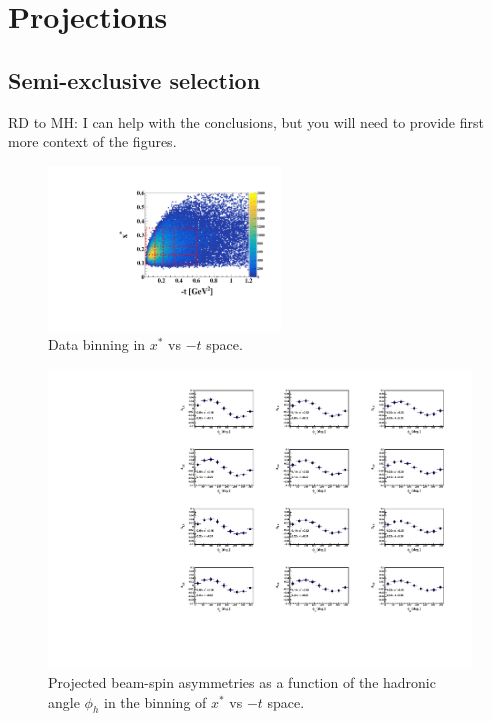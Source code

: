 \section{Projections}
\subsection{Semi-exclusive selection}
RD to MH: I can help with the conclusions, but you will need to provide first more 
context of the figures. 

\begin{figure}[htb]
  \centering
    \includegraphics[width=0.55\textwidth,clip]{figs/pdf/t_x*.pdf}
  \caption{Data binning in $x^{*}$ vs $-t$ space.
   \label{fig:binning_x_t}}
\end{figure}

\begin{figure}[htb]
  \centering
    \includegraphics[width=1.1\textwidth,clip]{figs/pdf/BSA_incoherent_Phi_x_t.pdf}
  \caption{Projected beam-spin asymmetries as a function of the hadronic angle 
   $\phi_h$ in the binning of $x^{*}$ vs $-t$ space.
   \label{fig:alu_semi}}
\end{figure}




